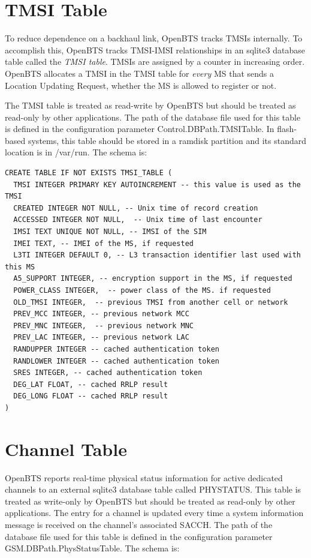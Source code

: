 \documentclass[11pt,openany]{book}
\begin{document}
\section{TMSI Table}
\label{sec:TMSITable}
To reduce dependence on a backhaul link, OpenBTS tracks TMSIs internally.
To accomplish this, OpenBTS tracks TMSI-IMSI relationships in an sqlite3 database table called the \emph{TMSI table}.
TMSIs are assigned by a counter in increasing order.
OpenBTS allocates a TMSI in the TMSI table for \emph{every} MS that sends a Location Updating Request, whether the MS is allowed to register or not.

The TMSI table is treated as read-write by OpenBTS but should be treated as read-only by other applications.
The path of the database file used for this table is defined in the configuration parameter Control.DBPath.TMSITable.  In flash-based systems, this table should be stored in a ramdisk partition and its standard location is in /var/run.  The schema is:
\begin{verbatim}
CREATE TABLE IF NOT EXISTS TMSI_TABLE (
  TMSI INTEGER PRIMARY KEY AUTOINCREMENT -- this value is used as the TMSI
  CREATED INTEGER NOT NULL, -- Unix time of record creation
  ACCESSED INTEGER NOT NULL,  -- Unix time of last encounter
  IMSI TEXT UNIQUE NOT NULL, -- IMSI of the SIM
  IMEI TEXT, -- IMEI of the MS, if requested
  L3TI INTEGER DEFAULT 0, -- L3 transaction identifier last used with this MS
  A5_SUPPORT INTEGER, -- encryption support in the MS, if requested
  POWER_CLASS INTEGER,  -- power class of the MS. if requested
  OLD_TMSI INTEGER,  -- previous TMSI from another cell or network
  PREV_MCC INTEGER, -- previous network MCC
  PREV_MNC INTEGER,  -- previous network MNC
  PREV_LAC INTEGER, -- previous network LAC
  RANDUPPER INTEGER -- cached authentication token
  RANDLOWER INTEGER -- cached authentication token
  SRES INTEGER, -- cached authentication token
  DEG_LAT FLOAT, -- cached RRLP result
  DEG_LONG FLOAT -- cached RRLP result
)
\end{verbatim}




\section{Channel Table}
\label{sec:channelTable}
OpenBTS reports real-time physical status information for active dedicated channels to an external sqlite3 database table called PHYSTATUS.
This table is treated as write-only by OpenBTS but should be treated as read-only by other applications.  The entry for a channel is updated every time a system information message is received on the channel's associated SACCH.
The path of the database file used for this table is defined in the configuration parameter GSM.DBPath.PhysStatusTable.  The schema is:
\end{document}
